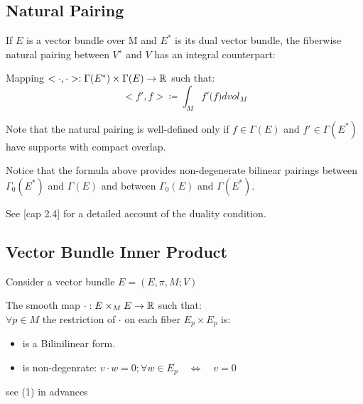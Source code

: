 \documentclass[a4paper,12pt]{scrartcl}    %
\begin{document}
\subsection{Natural Pairing}
If $E$ is a vector bundle over M and $E^*$ is its dual vector bundle, the fiberwise natural pairing between $V^∗$ and $V$ has an integral counterpart:
\begin{definition}\label{Def:NaturalPairing}
	Mapping $< \cdot , \cdot > : \Gamma(E^*) \times \Gamma(E) \rightarrow \mathbb{R}$ such that:
		\begin{displaymath}
			< f' , f > \coloneqq  \int_M f' \big( f \big) dvol_M
		\end{displaymath}

\end{definition}
\begin{observation}
	Note that the natural pairing is well-defined only if $f\in \Gamma(E)$ and $f' \in \Gamma(E^*)$ have supports with compact overlap.
\end{observation}
\begin{observation}
Notice that the formula above provides non-degenerate bilinear pairings between $\Gamma_0(E^*)$ and	 $\Gamma(E)$ and between $\Gamma_0(E)$ and	 $\Gamma(E^*)$.
\end{observation}

See \cite{bar}[cap 2.4] for a detailed account of the duality condition.

\subsection{Vector Bundle Inner Product}
Consider a vector bundle $E=(E,\pi,M;V)$ 
\begin{definition}\label{Def:BundleInnerProd}
	The smooth map $\cdot: E \times_M E \rightarrow \mathbb{R}$ such that:\\
	$\forall p\in M$ the restriction of $\cdot$ on each fiber $E_p \times E_p$ is:
	\begin{itemize}
		\item  is a Bilinilinear form.
		\item is non-degenrate: $v\cdot w = 0 ; \forall w \in E_p \quad \Leftrightarrow \quad v=0$
	\end{itemize}
\end{definition}

\begin{definition}\label{Def:InnerPairing}
	see (1) in advances
\end{definition}
\end{document}
